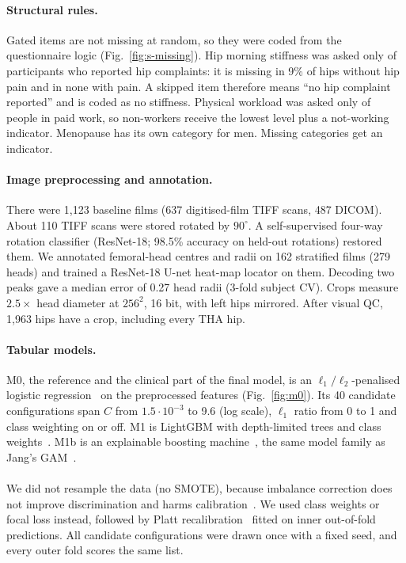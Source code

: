 \paragraph{Structural rules.}
Gated items are not missing at random, so they were coded from the questionnaire logic (Fig.~\ref{fig:s-missing}). Hip
morning stiffness was asked only of participants who reported hip complaints: it is missing in 9\% of hips without hip
pain and in none with pain. A skipped item therefore means ``no hip complaint reported'' and is coded as no stiffness.
Physical workload was asked only of people in paid work, so non-workers receive the lowest level plus a not-working
indicator. Menopause has its own category for men. Missing categories get an indicator.

\paragraph{Image preprocessing and annotation.}
There were 1,123 baseline films (637 digitised-film TIFF scans, 487 DICOM). About 110 TIFF scans were stored rotated by
$90^\circ$. A self-supervised four-way rotation classifier (ResNet-18; 98.5\% accuracy on held-out rotations) restored
them. We annotated femoral-head centres and radii on 162 stratified films (279 heads) and trained a ResNet-18 U-net
heat-map locator on them. Decoding two peaks gave a median error of 0.27 head radii (3-fold subject CV). Crops measure
$2.5\times$ head diameter at $256^2$, 16 bit, with left hips mirrored. After visual QC, 1,963 hips have a crop,
including every THA hip.

\paragraph{Tabular models.}
M0, the reference and the clinical part of the final model, is an $\ell_1/\ell_2$-penalised logistic
regression~\cite{zou2005elasticnet} on the preprocessed features (Fig.~\ref{fig:m0}). Its 40 candidate configurations
span $C$ from $1.5\cdot10^{-3}$ to 9.6 (log scale), $\ell_1$ ratio from 0 to 1 and class weighting on or off. M1 is
LightGBM with depth-limited trees and class weights~\cite{ke2017lightgbm}. M1b is an explainable boosting
machine~\cite{nori2019interpretml}, the same model family as Jang's GAM~\cite{jang2023}.

\paragraph{}
We did not resample the data (no SMOTE), because imbalance correction does not improve discrimination and harms
calibration~\cite{vandengoorbergh2022}. We used class weights or focal loss instead, followed by Platt
recalibration~\cite{platt1999} fitted on inner out-of-fold predictions. All candidate configurations were drawn once
with a fixed seed, and every outer fold scores the same list.

